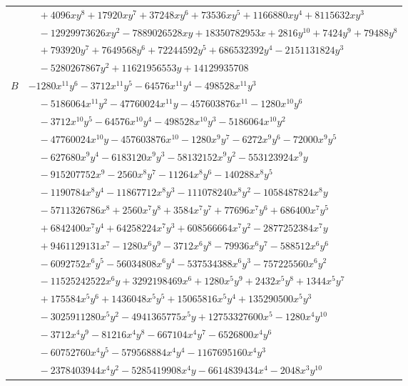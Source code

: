 \documentclass[11pt]{article}
\begin{document}
\begin{longtable}{@{}ll@{}}
 & $\quad +4096xy^{8}+17920xy^{7}+37248xy^{6}+73536xy^{5}+1166880xy^{4}+8115632xy^{3}$\\
 & $\quad -12929973626xy^{2}-7889026528xy+18350782953x+2816y^{10}+7424y^{9}+79488y^{8}$\\
 & $\quad +793920y^{7}+7649568y^{6}+72244592y^{5}+686532392y^{4}-2151131824y^{3}$\\
 & $\quad -5280267867y^{2}+11621956553y+14129935708$\\
$B$ & $-1280x^{11}y^{6}-3712x^{11}y^{5}-64576x^{11}y^{4}-498528x^{11}y^{3}$\\
 & $\quad -5186064x^{11}y^{2}-47760024x^{11}y-457603876x^{11}-1280x^{10}y^{6}$\\
 & $\quad -3712x^{10}y^{5}-64576x^{10}y^{4}-498528x^{10}y^{3}-5186064x^{10}y^{2}$\\
 & $\quad -47760024x^{10}y-457603876x^{10}-1280x^{9}y^{7}-6272x^{9}y^{6}-72000x^{9}y^{5}$\\
 & $\quad -627680x^{9}y^{4}-6183120x^{9}y^{3}-58132152x^{9}y^{2}-553123924x^{9}y$\\
 & $\quad -915207752x^{9}-2560x^{8}y^{7}-11264x^{8}y^{6}-140288x^{8}y^{5}$\\
 & $\quad -1190784x^{8}y^{4}-11867712x^{8}y^{3}-111078240x^{8}y^{2}-1058487824x^{8}y$\\
 & $\quad -5711326786x^{8}+2560x^{7}y^{8}+3584x^{7}y^{7}+77696x^{7}y^{6}+686400x^{7}y^{5}$\\
 & $\quad +6842400x^{7}y^{4}+64258224x^{7}y^{3}+608566664x^{7}y^{2}-2877252384x^{7}y$\\
 & $\quad +9461129131x^{7}-1280x^{6}y^{9}-3712x^{6}y^{8}-79936x^{6}y^{7}-588512x^{6}y^{6}$\\
 & $\quad -6092752x^{6}y^{5}-56034808x^{6}y^{4}-537534388x^{6}y^{3}-757225560x^{6}y^{2}$\\
 & $\quad -11525242522x^{6}y+3292198469x^{6}+1280x^{5}y^{9}+2432x^{5}y^{8}+1344x^{5}y^{7}$\\
 & $\quad +175584x^{5}y^{6}+1436048x^{5}y^{5}+15065816x^{5}y^{4}+135290500x^{5}y^{3}$\\
 & $\quad -3025911280x^{5}y^{2}-4941365775x^{5}y+12753327600x^{5}-1280x^{4}y^{10}$\\
 & $\quad -3712x^{4}y^{9}-81216x^{4}y^{8}-667104x^{4}y^{7}-6526800x^{4}y^{6}$\\
 & $\quad -60752760x^{4}y^{5}-579568884x^{4}y^{4}-1167695160x^{4}y^{3}$\\
 & $\quad -2378403944x^{4}y^{2}-5285419908x^{4}y-6614839434x^{4}-2048x^{3}y^{10}$\\

\end{longtable}
\end{document}
